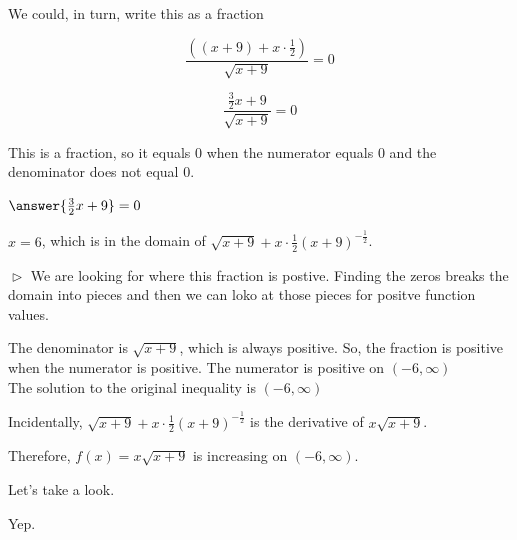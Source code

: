 \documentclass{ximera}
\begin{document}
\begin{example}
We could, in turn, write this as a fraction


\[ \frac{\left((x+9) + x \cdot \frac{1}{2}\right)}{\sqrt{x+9}} = 0 \]


\[ \frac{ \frac{3}{2} x + 9}{\sqrt{x+9}} = 0 \]



This is a fraction, so it equals $0$ when the numerator equals $0$ and the denominator does not equal $0$.


$\answer{\frac{3}{2} x + 9} = 0$



$x = 6$, which is in the domain of $\sqrt{x+9} + x \cdot \frac{1}{2} (x+9)^{-\tfrac{1}{2}}$. 

$\vartriangleright$ We are looking for where this fraction is postive. Finding the zeros breaks the domain into pieces and then we can loko at those pieces for positve function values.

The denominator is $\sqrt{x+9}$, which is always positive.  So, the fraction is positive when the numerator is positive.  The numerator is positive on $(-6, \infty)$ \\





The solution to the original inequality is $(-6, \infty)$




\end{example}



Incidentally, $\sqrt{x+9} + x \cdot \frac{1}{2} (x+9)^{-\tfrac{1}{2}}$ is the derivative of $x \sqrt{x+9}$. 

Therefore, $f(x) = x \sqrt{x+9}$ is increasing on $(-6, \infty)$. 

Let's take a look.







\begin{center}
\end{center}


Yep.
\end{document}
